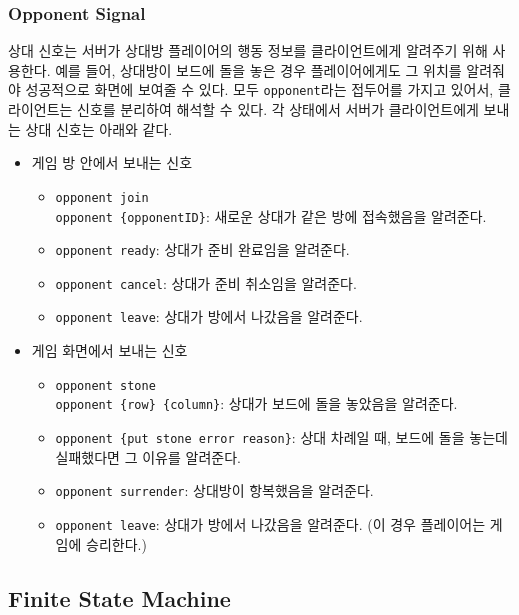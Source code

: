 \documentclass[a4paper, 10pt]{article}
\begin{document}
\subsubsection{Opponent Signal}
상대 신호는 서버가 상대방 플레이어의 행동 정보를 클라이언트에게 알려주기 위해
사용한다. 예를 들어, 상대방이 보드에 돌을 놓은 경우 플레이어에게도 그 위치를
알려줘야 성공적으로 화면에 보여줄 수 있다. 모두 \texttt{opponent}라는 접두어를
가지고 있어서, 클라이언트는 신호를 분리하여 해석할 수 있다.
각 상태에서 서버가 클라이언트에게 보내는 상대 신호는 아래와 같다.
\begin{itemize}
  \item 게임 방 안에서 보내는 신호
  \begin{itemize}
    \item \texttt{opponent join\\opponent \{opponentID\}}: 새로운 상대가 같은 방에 접속했음을 알려준다.
    \item \texttt{opponent ready}: 상대가 준비 완료임을 알려준다.
    \item \texttt{opponent cancel}: 상대가 준비 취소임을 알려준다.
    \item \texttt{opponent leave}: 상대가 방에서 나갔음을 알려준다.
  \end{itemize}
  \item 게임 화면에서 보내는 신호
  \begin{itemize}
    \item \texttt{opponent stone\\opponent \{row\} \{column\}}: 상대가 보드에 돌을 놓았음을 알려준다.
    \item \texttt{opponent \{put stone error reason\}}: 상대 차례일 때, 보드에 돌을 놓는데 실패했다면 그 이유를 알려준다.
    \item \texttt{opponent surrender}: 상대방이 항복했음을 알려준다.
    \item \texttt{opponent leave}: 상대가 방에서 나갔음을 알려준다. (이 경우 플레이어는 게임에 승리한다.)
  \end{itemize}
\end{itemize}
\newpage

\subsection{Finite State Machine}
\end{document}

